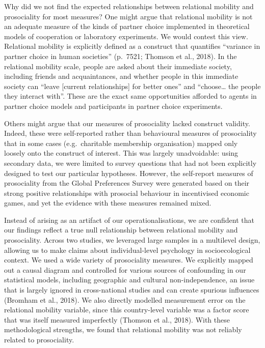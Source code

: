 \documentclass[english,man,floatsintext]{apa6}
\begin{document}
Why did we not find the expected relationships between relational mobility and prosociality for most measures? One might argue that relational mobility is not an adequate measure of the kinds of partner choice implemented in theoretical models of cooperation or laboratory experiments. We would contest this view. Relational mobility is explicitly defined as a construct that quantifies \enquote{variance in partner choice in human societies} (p.~7521; Thomson et al., 2018). In the relational mobility scale, people are asked about their immediate society, including friends and acquaintances, and whether people in this immediate society can \enquote{leave {[}current relationships{]} for better ones} and \enquote{choose\ldots{} the people they interact with}. These are the exact same opportunities afforded to agents in partner choice models and participants in partner choice experiments.

Others might argue that our measures of prosociality lacked construct validity. Indeed, these were self-reported rather than behavioural measures of prosociality that in some cases (e.g.~charitable membership organisation) mapped only loosely onto the construct of interest. This was largely unadvoidable: using secondary data, we were limited to survey questions that had not been explicitly designed to test our particular hypotheses. However, the self-report measures of prosociality from the Global Preferences Survey were generated based on their strong positive relationships with prosocial behaviour in incentivised economic games, and yet the evidence with these measures remained mixed.

Instead of arising as an artifact of our operationalisations, we are confident that our findings reflect a true null relationship between relational mobility and prosociality. Across two studies, we leveraged large samples in a multilevel design, allowing us to make claims about individual-level psychology in socioecological context. We used a wide variety of prosociality measures. We explicitly mapped out a causal diagram and controlled for various sources of confounding in our statistical models, including geographic and cultural non-independence, an issue that is largely ignored in cross-national studies and can create spurious influences (Bromham et al., 2018). We also directly modelled measurement error on the relational mobility variable, since this country-level variable was a factor score that was itself measured imperfectly (Thomson et al., 2018). With these methodological strengths, we found that relational mobility was not reliably related to prosociality.
\end{document}
